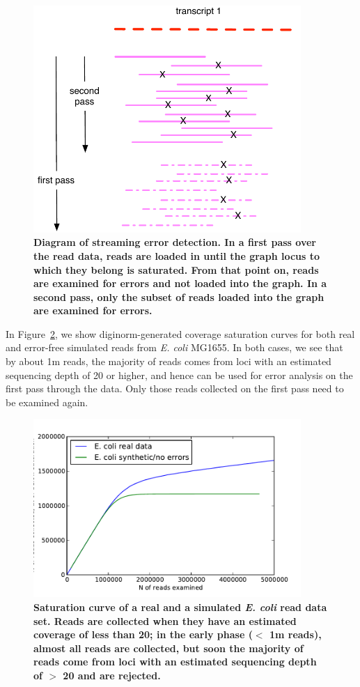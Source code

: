 \documentclass{article}
\begin{document}
\begin{figure}[!ht]
 \centerline{\includegraphics[width=4in]{./figures/graph-saturation}}
\caption{\bf Diagram of streaming error detection. In a first pass
over the read data, reads are loaded in until the graph locus to which
they belong is saturated.  From that point on, reads are examined for
errors and not loaded into the graph.  In a second pass, only the subset
of reads loaded into the graph are examined for errors.}
\label{fig:concept}
\end{figure}

In Figure~\ref{fig:saturation}, we show diginorm-generated coverage
saturation curves for both real and error-free simulated reads from
{\em E. coli} MG1655.  In both cases, we see that by about 1m reads,
the majority of reads comes from loci with an estimated sequencing
depth of 20 or higher, and hence can be used for error analysis on the
first pass through the data.  Only those reads collected on the first
pass need to be examined again.

\begin{figure}[!ht]
 \centerline{\includegraphics[width=4in]{./figures/saturation}}
\caption{\bf Saturation curve of a real and a simulated {\em E. coli} read data
set.  Reads are collected when they have an estimated coverage of less
than 20; in the early phase ($<$ 1m reads), almost all reads are
collected, but soon the majority of reads come from loci with an estimated
sequencing depth of $>$ 20 and are rejected.}
\label{fig:saturation}
\end{figure}
\end{document}
